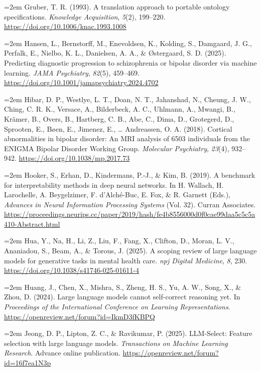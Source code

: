 \documentclass[11pt,a4paper,twoside]{article}
\begin{document}
\hangindent=2em Gruber, T. R. (1993). A translation approach to portable ontology specifications. \textit{Knowledge Acquisition}, \textit{5}(2), 199--220. \url{https://doi.org/10.1006/knac.1993.1008}

\hangindent=2em Hansen, L., Bernstorff, M., Enevoldsen, K., Kolding, S., Damgaard, J. G., Perfalk, E., Nielbo, K. L., Danielsen, A. A., \& Østergaard, S. D. (2025). Predicting diagnostic progression to schizophrenia or bipolar disorder via machine learning. \textit{JAMA Psychiatry}, \textit{82}(5), 459--469. \url{https://doi.org/10.1001/jamapsychiatry.2024.4702}

\hangindent=2em Hibar, D. P., Westlye, L. T., Doan, N. T., Jahanshad, N., Cheung, J. W., Ching, C. R. K., Versace, A., Bilderbeck, A. C., Uhlmann, A., Mwangi, B., Krämer, B., Overs, B., Hartberg, C. B., Abe, C., Dima, D., Grotegerd, D., Sprooten, E., Bøen, E., Jimenez, E., \ldots{} Andreassen, O. A. (2018). Cortical abnormalities in bipolar disorder: An MRI analysis of 6503 individuals from the ENIGMA Bipolar Disorder Working Group. \textit{Molecular Psychiatry}, \textit{23}(4), 932--942. \url{https://doi.org/10.1038/mp.2017.73}

\hangindent=2em Hooker, S., Erhan, D., Kindermans, P.-J., \& Kim, B. (2019). A benchmark for interpretability methods in deep neural networks. In H. Wallach, H. Larochelle, A. Beygelzimer, F. d'Alch\'{e}-Buc, E. Fox, \& R. Garnett (Eds.), \textit{Advances in Neural Information Processing Systems} (Vol. 32). Curran Associates. \url{https://proceedings.neurips.cc/paper/2019/hash/fe4b8556000d0f0cae99daa5c5c5a410-Abstract.html}

\hangindent=2em Hua, Y., Na, H., Li, Z., Liu, F., Fang, X., Clifton, D., Moran, L. V., Ananiadou, S., Beam, A., \& Torous, J. (2025). A scoping review of large language models for generative tasks in mental health care. \textit{npj Digital Medicine}, \textit{8}, 230. \url{https://doi.org/10.1038/s41746-025-01611-4}

\hangindent=2em Huang, J., Chen, X., Mishra, S., Zheng, H. S., Yu, A. W., Song, X., \& Zhou, D. (2024). Large language models cannot self-correct reasoning yet. In \textit{Proceedings of the International Conference on Learning Representations}. \url{https://openreview.net/forum?id=IkmD3fKBPQ}

\hangindent=2em Jeong, D. P., Lipton, Z. C., \& Ravikumar, P. (2025). LLM-Select: Feature selection with large language models. \textit{Transactions on Machine Learning Research}. Advance online publication. \url{https://openreview.net/forum?id=16f7ea1N3p}
\end{document}
